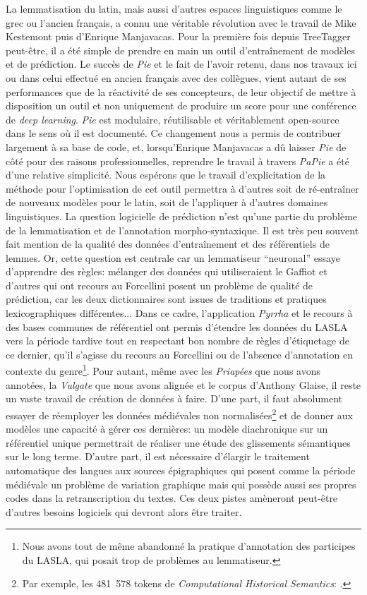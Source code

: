La lemmatisation du latin, mais aussi d'autres espaces linguistiques comme le grec ou l'ancien français, a connu une véritable révolution avec le travail de Mike Kestemont puis d'Enrique Manjavacas. Pour la première fois depuis TreeTagger peut-être, il a été simple de prendre en main un outil d'entraînement de modèles et de prédiction. Le succès de \textit{Pie} et le fait de l'avoir retenu, dans nos travaux ici ou dans celui effectué en ancien français avec des collègues, vient autant de ses performances que de la réactivité de ses concepteurs, de leur objectif de mettre à disposition un outil et non uniquement de produire un score pour une conférence de \textit{deep learning}. \textit{Pie} est modulaire, réutilisable et véritablement open-source dans le sens où il est documenté. Ce changement nous a permis de contribuer largement à sa base de code, et, lorsqu'Enrique Manjavacas a dû laisser \textit{Pie} de côté pour des raisons professionnelles, reprendre le travail à travers \textit{PaPie} a été d'une relative simplicité. Nous espérons que le travail d'explicitation de la méthode pour l'optimisation de cet outil permettra à d'autres soit de ré-entraîner de nouveaux modèles pour le latin, soit de l'appliquer à d'autres domaines linguistiques. La question logicielle de prédiction n'est qu'une partie du problème de la lemmatisation et de l'annotation morpho-syntaxique. Il est très peu souvent fait mention de la qualité des données d'entraînement et des référentiels de lemmes. Or, cette question est centrale car un lemmatiseur \enquote{neuronal} essaye d'apprendre des règles: mélanger des données qui utiliseraient le Gaffiot et d'autres qui ont recours au Forcellini posent un problème de qualité de prédiction, car les deux dictionnaires sont issues de traditions et pratiques lexicographiques différentes... Dans ce cadre, l'application \textit{Pyrrha} et le recours à des bases communes de référentiel ont permis d'étendre les données du LASLA vers la période tardive tout en respectant bon nombre de règles d'étiquetage de ce dernier, qu'il s'agisse du recours au Forcellini ou de l'absence d'annotation en contexte du genre\footnote{Nous avons tout de même abandonné la pratique d'annotation des participes du LASLA, qui posait trop de problèmes au lemmatiseur.}. Pour autant, même avec les \textit{Priapées} que nous avons annotées, la \textit{Vulgate} que nous avons alignée et le corpus d'Anthony Glaise, il reste un vaste travail de création de données à faire. D'une part, il faut absolument essayer de réemployer les données médiévales non normalisées\footnote{Par exemple, les 481~578 tokens de \textit{Computational Historical Semantics}: \textcite{capitularies}.} et de donner aux modèles une capacité à gérer ces dernières: un modèle diachronique sur un référentiel unique permettrait de réaliser une étude des glissements sémantiques sur le long terme. D'autre part, il est nécessaire d'élargir le traitement automatique des langues aux sources épigraphiques qui posent comme la période médiévale un problème de variation graphique mais qui possède aussi ses propres codes dans la retranscription du textes. Ces deux pistes amèneront peut-être d'autres besoins logiciels qui devront alors être traiter.


